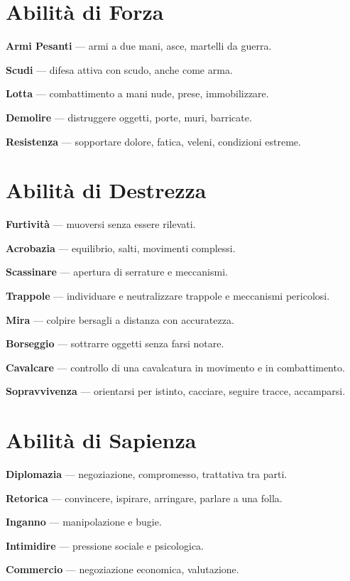 \documentclass[10pt,a4paper]{article}
\begin{document}
\section*{Abilità di Forza}

\textbf{Armi Pesanti} — armi a due mani, asce, martelli da guerra.


\textbf{Scudi} — difesa attiva con scudo, anche come arma.


\textbf{Lotta} — combattimento a mani nude, prese, immobilizzare.


\textbf{Demolire} — distruggere oggetti, porte, muri, barricate.


\textbf{Resistenza} — sopportare dolore, fatica, veleni, condizioni estreme.


\section*{Abilità di Destrezza}

\textbf{Furtività} — muoversi senza essere rilevati.


\textbf{Acrobazia} — equilibrio, salti, movimenti complessi.


\textbf{Scassinare} — apertura di serrature e meccanismi.


\textbf{Trappole} — individuare e neutralizzare trappole e meccanismi pericolosi.


\textbf{Mira} — colpire bersagli a distanza con accuratezza.


\textbf{Borseggio} — sottrarre oggetti senza farsi notare.


\textbf{Cavalcare} — controllo di una cavalcatura in movimento e in combattimento.


\textbf{Sopravvivenza} — orientarsi per istinto, cacciare, seguire tracce, accamparsi.


\section*{Abilità di Sapienza}

\textbf{Diplomazia} — negoziazione, compromesso, trattativa tra parti.


\textbf{Retorica} — convincere, ispirare, arringare, parlare a una folla.


\textbf{Inganno} — manipolazione e bugie.


\textbf{Intimidire} — pressione sociale e psicologica.


\textbf{Commercio} — negoziazione economica, valutazione.
\end{document}
